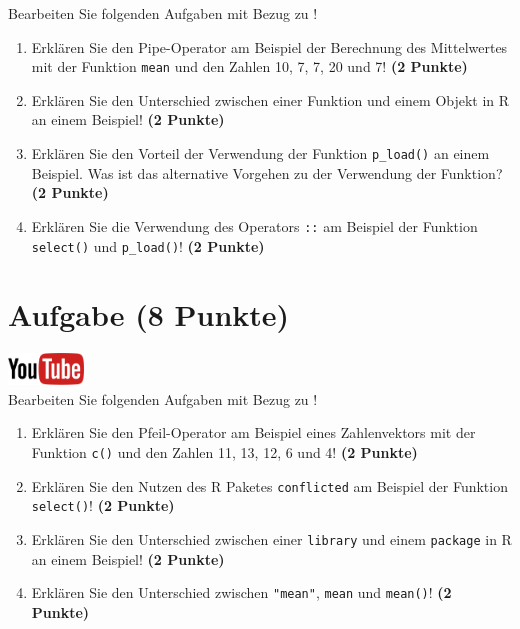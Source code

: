 \documentclass[a4paper, 10pt]{scrartcl}\usepackage[]{graphicx}\usepackage[]{xcolor}
\begin{document}
Bearbeiten Sie folgenden Aufgaben mit Bezug zu \Rlogo! 

\begin{enumerate}
\item Erkl{\"a}ren Sie den Pipe-Operator am Beispiel der Berechnung des Mittelwertes
mit der Funktion \texttt{mean} und den Zahlen 10, 7, 7, 20 und 7!  \textbf{(2 Punkte)} 
\item Erkl{\"a}ren Sie den Unterschied zwischen einer Funktion und einem Objekt
  in R an einem Beispiel! \textbf{(2 Punkte)} 
\item Erkl{\"a}ren Sie den Vorteil der Verwendung der Funktion \texttt{p\_load()} an
einem Beispiel. Was ist das alternative Vorgehen zu der Verwendung der
Funktion? \textbf{(2 Punkte)} 
\item Erkl{\"a}ren Sie die Verwendung des Operators \texttt{::} am Beispiel der
Funktion \texttt{select()} und \texttt{p\_load()}! \textbf{(2 Punkte)} 
\end{enumerate}


 
\clearpage

\section{Aufgabe \hfill (8 Punkte)}

\hfill\href{https://youtu.be/xP9xjcLIbDE}{\includegraphics[width =
  2cm]{img/youtube}}\\[1Ex]




Bearbeiten Sie folgenden Aufgaben mit Bezug zu \Rlogo! 

\begin{enumerate}
  \item Erkl{\"a}ren Sie den Pfeil-Operator am Beispiel eines Zahlenvektors mit der
Funktion \texttt{c()} und den Zahlen 11, 13, 12, 6 und 4! \textbf{(2 Punkte)}
\item Erkl{\"a}ren Sie den Nutzen des R Paketes \texttt{conflicted} am Beispiel der
  Funktion \texttt{select()}! \textbf{(2 Punkte)} 
\item Erkl{\"a}ren Sie den Unterschied zwischen einer \texttt{library} und
  einem \texttt{package} in R an einem Beispiel! \textbf{(2 Punkte)} 
\item Erkl{\"a}ren Sie den Unterschied zwischen \texttt{"mean"}, \texttt{mean}
  und \texttt{mean()}! \textbf{(2 Punkte)} 
\end{enumerate}
\end{document}
